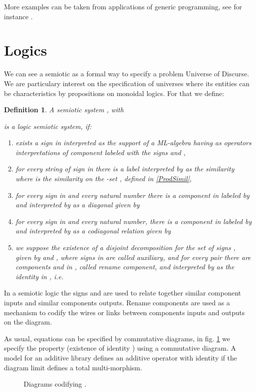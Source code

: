 \documentclass[oribibl]{llncs}
\newtheorem{defn}{Definition}
\begin{document}
More examples can be taken from applications of generic programming, see for instance \cite{Fiadeiro97}.

\section{Logics}\label{logics}

We can see a semiotic as a formal way to specify a problem Universe of Discurse. We are particulary interest on the specification of universes where its entities can be characteristics by propositions on monoidal logics. For that we define:
\begin{defn}
A semiotic system , with

is a \emph{logic semiotic system}, if:
\begin{enumerate}
  \item exists a sign in  interpreted as the support  of a ML-algebra having as operators interpretations of
component labeled with the signs   and ,
  \item for every string  of sign in  there is a label  interpreted by  as the similarity  where  is the similarity on the -set , defined in \ref{ProdSimil},
  \item for every sign  in  and every natural number  there is a
  component in  labeled by  and interpreted by  as a
  diagonal 
  given by 
  \item for every sign  in  and every natural number,  there is a
  component in  labeled by  and interpreted by  as a
  codiagonal relation  given by 
  \item we suppose the existence of a disjoint decomposition for the set of signs , given by 
  and , where signs in  are called \emph{auxiliary}, and
  for every pair  there are
  components  and  in , called \emph{rename component}, and interpreted by  as the
  identity in , i.e. 
\end{enumerate}
\end{defn}
In a semiotic logic the signs  and  are used to relate together similar component inputs and similar components outputs. Rename components are used as a mechanism to codify the wires or links between components inputs and outputs on the diagram.

As usual, equations can be specified by commutative diagrams, in fig. \ref{identity} we
specify the property  (existence of identity )
using a commutative diagram. A model  for an additive
library  defines an additive operator with identity if
the diagram limit defines a total multi-morphism.
\begin{figure}[h]

\caption{Diagrams codifying .}\label{identity}
\end{figure}
\end{document}
